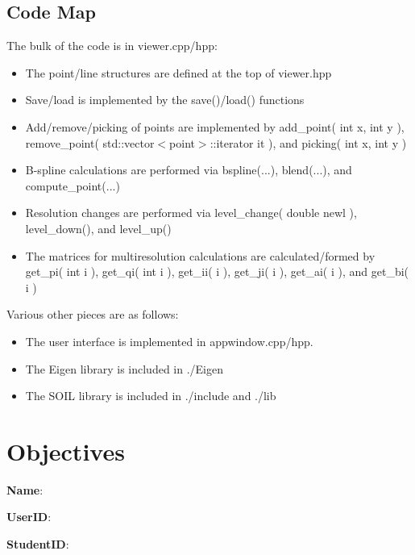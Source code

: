 \documentclass[11pt]{article}
\begin{document}
\subsection{Code Map}
\label{sec:codemap}
The bulk of the code is in viewer.cpp/hpp:
\begin{itemize}
\item The point/line structures are defined at the top of viewer.hpp
\item Save/load is implemented by the save()/load() functions
\item Add/remove/picking of points are implemented by add\_point( int x, int y ), remove\_point( std::vector$<$point$>$::iterator it ), and picking( int x, int y )
\item B-spline calculations are performed via bspline(...), blend(...), and compute\_point(...)
\item Resolution changes are performed via level\_change( double newl ), level\_down(), and level\_up()
\item The matrices for multiresolution calculations are calculated/formed by get\_pi( int i ), get\_qi( int i ), get\_ii( i ), get\_ji( i ), get\_ai( i ), and get\_bi( i )
\end{itemize}

Various other pieces are as follows:
\begin{itemize}
\item The user interface is implemented in appwindow.cpp/hpp.
\item The Eigen library is included in ./Eigen
\item The SOIL library is included in ./include and ./lib
\end{itemize}

\newpage

\section{Objectives}
\label{sec:objectives}
\begin{flushleft}
\textbf{Name}:
\end{flushleft}
\begin{flushleft}
\textbf{UserID}:
\end{flushleft}
\begin{flushleft}
\textbf{StudentID}:
\end{flushleft}
\end{document}
